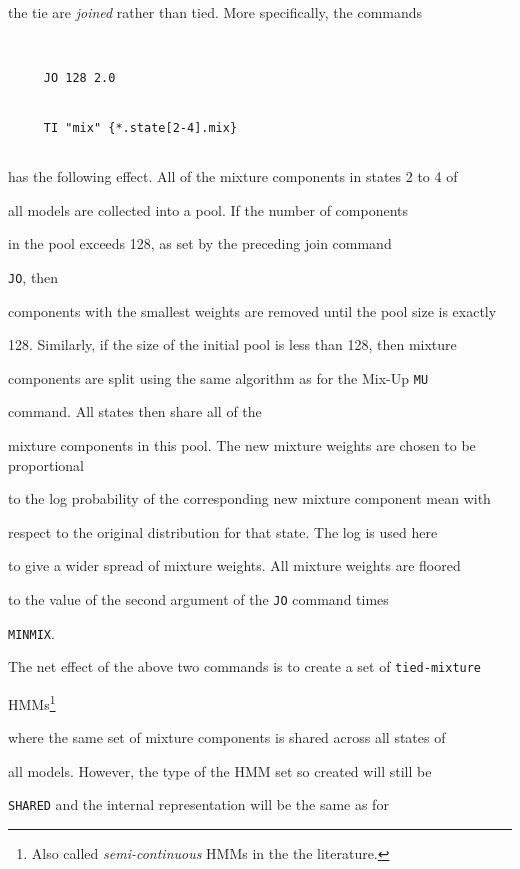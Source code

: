 the tie are {\it joined} rather than tied. More specifically, the commands


\begin{verbatim}


     JO 128 2.0


     TI "mix" {*.state[2-4].mix} 


\end{verbatim}


has the following effect.  All of the mixture components in states 2 to 4 of


all models are collected into a pool.  If the number of components


in the pool exceeds 128, as set by the preceding join command 


\texttt{JO}, then


components with the smallest weights are removed until the pool size is exactly


128.  Similarly, if the size of the initial pool is less than 128, then mixture


components are split using the same algorithm as for the Mix-Up \texttt{MU}


command.   All states then share all of the 


mixture components in this pool.  The new mixture weights are chosen to be proportional


to the log probability of the corresponding new mixture component mean with


respect to the original distribution for that state.  The log is used here


to give a wider spread of mixture weights.  All mixture weights are floored


to the value of the second argument of the \texttt{JO} command times 


\texttt{MINMIX}.





The net effect of the above two commands is to create a set of \texttt{tied-mixture}


HMMs\footnote{Also called {\it semi-continuous} HMMs in the the literature.}


where the same set of mixture components is shared across all states of


all models.  However, the type of the HMM set so created will still be


\texttt{SHARED} and the internal representation will be the same as for


